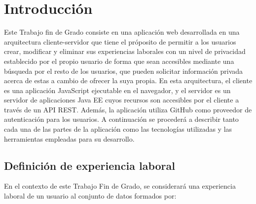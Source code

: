 \documentclass[a4paper, 12pt]{book}
\begin{document}

\tableofcontents 
\cleardoublepage
\listoffigures %



\cleardoublepage
\chapter{Introducción}
\label{sec:intro} %

Este Trabajo fin de Grado consiste en una aplicación web desarrollada en una arquitectura cliente-servidor que tiene el próposito de permitir a los usuarios crear, modificar y eliminar sus experiencias laborales con un nivel de privacidad establecido por el propio usuario
de forma que sean accesibles mediante una búsqueda por el resto de los usuarios, que pueden solicitar información privada acerca de estas a cambio de ofrecer la suya propia. 
En esta arquitectura, el cliente es una aplicación JavaScript ejecutable en el navegador, 
y el servidor es un servidor de aplicaciones Java EE cuyos recursos son accesibles por el cliente a través de un API REST. Además, la aplicación utiliza GitHub como proveedor de autenticación para los usuarios. 
A continuación se procederá a describir tanto cada una de las partes de la aplicación como las tecnologías utilizadas y las herramientas empleadas para su desarrollo.

\section{Definición de experiencia laboral}
\label{sec:intro_workexperiencedefinition}
En el contexto de este Trabajo Fin de Grado, se considerará una experiencia laboral de un usuario al conjunto de datos formados por:
\end{document}
